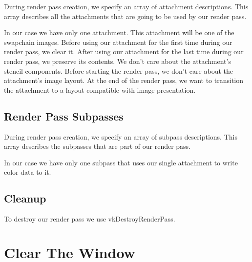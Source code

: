 During render pass creation, we specify an array of attachment descriptions.
This array describes all the attachments that are going to be used by our
render pass.

In our case we have only one attachment.
This attachment will be one of the swapchain images.
Before using our attachment for the first time during our render pass, we clear it.
After using our attachment for the last time during our render pass, we preserve
its contents.
We don't care about the attachment's stencil components.
Before starting the render pass, we don't care about the attachment's image layout.
At the end of the render pass, we want to transition the attachment to a layout
compatible with image presentation.

\begin{minipage}{\linewidth}{\noindent}
    
\end{minipage}

\subsection{Render Pass Subpasses}

During render pass creation, we specify an array of subpass descriptions.
This array describes the subpasses that are part of our render pass.

In our case we have only one subpass that uses our single attachment to write
color data to it.

\begin{minipage}{\linewidth}{\noindent}
    
\end{minipage}

\subsection{Cleanup}

To destroy our render pass we use vkDestroyRenderPass.

\section{Clear The Window}

